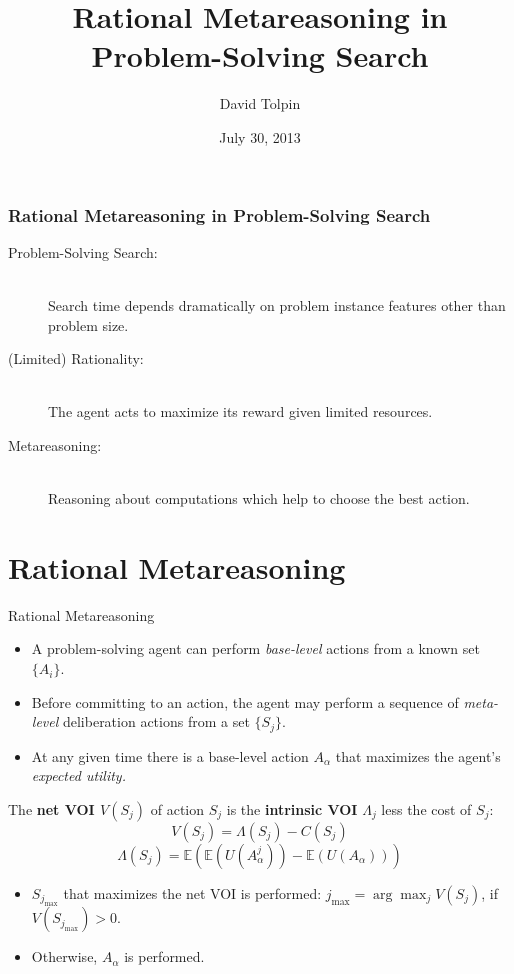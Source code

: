 \documentclass{beamer}
\title{Rational Metareasoning in Problem-Solving Search}
\author{David Tolpin}
\institute{Ben-Gurion University of the Negev\\Beer Sheva, Israel}
\date{July 30, 2013}
\begin{document}
\begin{frame}
\titlepage
\end{frame}

\begin{frame}
\frametitle{Rational Metareasoning in Problem-Solving Search}
\begin{description}
\item[Problem-Solving Search:] \hfill\\ Search time depends dramatically on
  problem instance features other than problem size.
\item[(Limited) Rationality:] \hfill\\ The agent acts to maximize its reward given
  limited resources.
\item[Metareasoning:] \hfill\\ Reasoning about computations which help to
  choose the best action.
\end{description}
\end{frame}

\begin{frame}
\tableofcontents
\end{frame}

\section{Rational Metareasoning}

\begin{frame}{Rational Metareasoning}
\begin{itemize}
\item A problem-solving agent can perform {\it base-level} actions from a known
          set $\{A_i\}$.
\item Before committing to an action, the agent may perform a sequence of
          {\it meta-level} deliberation actions from a set $\{S_j\}$.
\item At any given time there is a base-level action $A_\alpha$ that maximizes
          the agent's {\it expected utility.}
\end{itemize}

          The {\bf net VOI $V(S_j)$} of action $S_j$ is the {\bf intrinsic VOI} $\Lambda_j$ less the cost of $S_j$:
          \[V(S_j)=\Lambda(S_j)-C(S_j)\]
           \[\Lambda(S_j)=\mathbb{E}\left(\mathbb{E}(U(A_\alpha^j))-\mathbb{E}(U(A_\alpha))\right)\]

\begin{itemize} 
\item  $S_{j_{\max}}$ that maximizes the net VOI  is performed: $j_{\max} = \arg\max_jV(S_j)$, if $V(S_{j_{\max}})>0$.
\item Otherwise, $A_\alpha$ is performed.
\end{itemize}
\end{frame}
\end{document}

